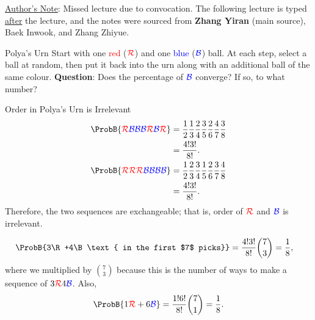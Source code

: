 
\underline{Author's Note}:
Missed lecture due to convocation. The following lecture is
typed \underline{after} the lecture, and the notes were
sourced from \textbf{Zhang Yiran} (main source), Baek Inwook, and Zhang Zhiyue.

\begin{Definition}{Polya's Urn}{}
    Start with one \textcolor{red}{red} ($ \textcolor{red}{\mathcal{R}} $) and one
    \textcolor{blue}{blue} ($ \textcolor{blue}{\mathcal{B}} $) ball.
    At each step, select a
    ball at random, then put it back into the urn along with an
    additional ball of the same colour.
    \tcblower{}
    \textbf{Question}: Does the percentage of $ \textcolor{blue}{\mathcal{B}} $ converge?
    If so, to what number?
\end{Definition}
\begin{Example}{Order in Polya's Urn is Irrelevant}{}
    \begin{align*}
        \ProbB{\R\B\B\B\R\B\R}
         & =\frac{1}{2}\frac{1}{3}\frac{2}{4}\frac{3}{5}\frac{2}{6}\frac{4}{7}\frac{3}{8} \\
         & =\frac{4!3!}{8!}.                                                              \\
        \ProbB{\R\R\R\B\B\B\B}
         & =\frac{1}{2}\frac{2}{3}\frac{3}{4}\frac{1}{5}\frac{2}{6}\frac{3}{7}\frac{4}{8} \\
         & =\frac{4!3!}{8!}.
    \end{align*}
    Therefore, the two sequences are exchangeable; that is,
    order of $ \textcolor{red}{\mathcal{R}} $ and $ \textcolor{blue}{\mathcal{B}} $ is irrelevant.
\end{Example}
\begin{Example}{}{}
    \begin{align*}
        \ProbB{3\R+4\B\text{ in the first $7$ picks}}
         & =\frac{4!3!}{8!}\binom{7}{3}=\frac{1}{8},
    \end{align*}
    where we multiplied by $ \binom{7}{3} $ because this is the
    number of ways to make a sequence of $ 3\textcolor{red}{\mathcal{R}}4\textcolor{blue}{\mathcal{B}} $. Also,
    \[ \ProbB{1\R+6\B}=\frac{1!6!}{8!}\binom{7}{1}=\frac{1}{8}. \]
\end{Example}
